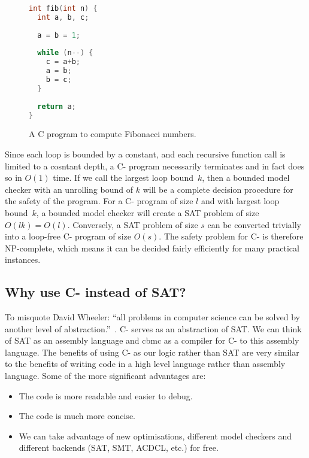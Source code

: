 \documentclass[a4paper]{llncs}
\begin{document}
\begin{figure}
 \begin{lstlisting}[language=C]
int fib(int n) {
  int a, b, c;
  
  a = b = 1;
  
  while (n--) {
    c = a+b;
    a = b;
    b = c;
  }
  
  return a;
}
 \end{lstlisting}

 \label{fig:not-c-}
 \caption{A C program to compute Fibonacci numbers.}
\end{figure}

Since each loop is bounded by a constant, and each recursive function call is
limited to a cosntant depth, a C- program necessarily terminates and in
fact does so in $O(1)$ time.  If we call the largest loop bound~$k$, then
a bounded model checker with an unrolling bound of $k$ will be a complete
decision procedure for the safety of the program.  For a C- program of
size $l$ and with largest loop bound~$k$, a bounded model checker will
create a SAT problem of size $O(lk) = O(l)$.  Conversely, a SAT problem
of size $s$ can be converted trivially into a loop-free C- program
of size $O(s)$.  The safety problem for C- is therefore NP-complete,
which means it can be decided fairly efficiently for many practical
instances.

\subsection{Why use C- instead of SAT?}
To misquote David Wheeler: ``all problems in computer science can be solved by
another level of abstraction.''~\cite{beautiful-code}.  C- serves as
an abstraction of SAT.  We can think of SAT as an assembly language and
{\sc cbmc} as a compiler for C- to this assembly language.  The benefits
of using C- as our logic rather than SAT are very similar to the benefits of
writing code in a high level language rather than assembly language.
Some of the more significant advantages are:

\begin{itemize}
 \item The code is more readable and easier to debug.
 \item The code is much more concise.
 \item We can take advantage of new optimisations, different model
 checkers and different backends (SAT, SMT, ACDCL, etc.) for free.
\end{itemize}
\end{document}
